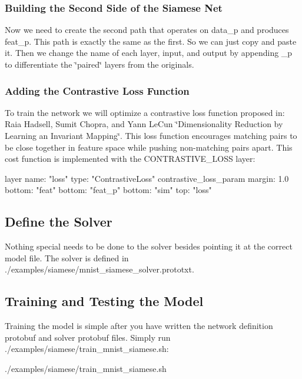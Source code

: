 \subsubsection*{Building the Second Side of the Siamese Net}

Now we need to create the second path that operates on {\ttfamily data\+\_\+p} and produces {\ttfamily feat\+\_\+p}. This path is exactly the same as the first. So we can just copy and paste it. Then we change the name of each layer, input, and output by appending {\ttfamily \+\_\+p} to differentiate the \char`\"{}paired\char`\"{} layers from the originals.

\subsubsection*{Adding the Contrastive Loss Function}

To train the network we will optimize a contrastive loss function proposed in\+: Raia Hadsell, Sumit Chopra, and Yann Le\+Cun \char`\"{}\+Dimensionality Reduction by Learning
an Invariant Mapping\char`\"{}. This loss function encourages matching pairs to be close together in feature space while pushing non-\/matching pairs apart. This cost function is implemented with the {\ttfamily C\+O\+N\+T\+R\+A\+S\+T\+I\+V\+E\+\_\+\+L\+O\+SS} layer\+: \begin{DoxyVerb}layer {
    name: "loss"
    type: "ContrastiveLoss"
    contrastive_loss_param {
        margin: 1.0
    }
    bottom: "feat"
    bottom: "feat_p"
    bottom: "sim"
    top: "loss"
}
\end{DoxyVerb}


\subsection*{Define the Solver}

Nothing special needs to be done to the solver besides pointing it at the correct model file. The solver is defined in {\ttfamily ./examples/siamese/mnist\+\_\+siamese\+\_\+solver.prototxt}.

\subsection*{Training and Testing the Model}

Training the model is simple after you have written the network definition protobuf and solver protobuf files. Simply run {\ttfamily ./examples/siamese/train\+\_\+mnist\+\_\+siamese.sh}\+: \begin{DoxyVerb}./examples/siamese/train_mnist_siamese.sh
\end{DoxyVerb}



